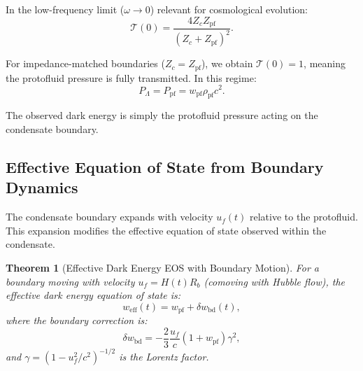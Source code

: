 \documentclass[11pt,a4paper]{article}
\newcommand{\wpf}{\ensuremath{w_{\mathrm{pf}}}}
\newcommand{\weff}{\ensuremath{w_{\mathrm{eff}}}}
\newcommand{\Ppf}{\ensuremath{P_{\mathrm{pf}}}}
\newcommand{\rhopf}{\ensuremath{\rho_{\mathrm{pf}}}}
\newtheorem{theorem}{Theorem}[section]
\theoremstyle{definition}
\theoremstyle{remark}
\begin{document}
In the low-frequency limit ($\omega \to 0$) relevant for cosmological evolution:
\begin{equation}
\mathcal{T}(0) = \frac{4 Z_c Z_{\mathrm{pf}}}{(Z_c + Z_{\mathrm{pf}})^2}.
\end{equation}

For impedance-matched boundaries ($Z_c = Z_{\mathrm{pf}}$), we obtain $\mathcal{T}(0) = 1$, meaning the protofluid pressure is fully transmitted. In this regime:
\begin{equation}
\boxed{P_\Lambda = \Ppf = \wpf \rhopf c^2.}
\end{equation}

The observed dark energy is simply the protofluid pressure acting on the condensate boundary.

\subsection{Effective Equation of State from Boundary Dynamics}
\label{sec:boundary_eos}

The condensate boundary expands with velocity $u_f(t)$ relative to the protofluid. This expansion modifies the effective equation of state observed within the condensate.

\begin{theorem}[Effective Dark Energy EOS with Boundary Motion]
\label{thm:weff_boundary}
For a boundary moving with velocity $u_f = H(t) R_b$ (comoving with Hubble flow), the effective dark energy equation of state is:
\begin{equation}
\label{eq:weff_general}
\weff(t) = \wpf + \delta w_{\mathrm{bd}}(t),
\end{equation}
where the boundary correction is:
\begin{equation}
\delta w_{\mathrm{bd}} = -\frac{2}{3}\frac{u_f}{c}(1 + \wpf)\gamma^2,
\end{equation}
and $\gamma = (1 - u_f^2/c^2)^{-1/2}$ is the Lorentz factor.
\end{theorem}
\end{document}

